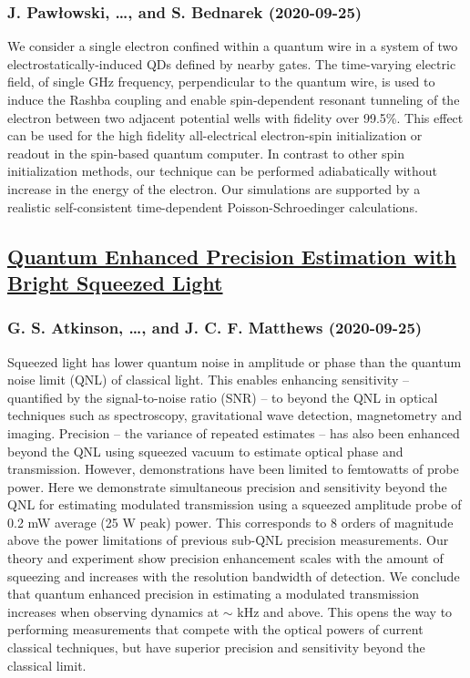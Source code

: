 \subsubsection*{J. Pawłowski, \dots, and S. Bednarek (2020-09-25)}
We consider a single electron confined within a quantum wire in a system of
two electrostatically-induced QDs defined by nearby gates. The time-varying
electric field, of single GHz frequency, perpendicular to the quantum wire, is
used to induce the Rashba coupling and enable spin-dependent resonant tunneling
of the electron between two adjacent potential wells with fidelity over 99.5\%.
This effect can be used for the high fidelity all-electrical electron-spin
initialization or readout in the spin-based quantum computer. In contrast to
other spin initialization methods, our technique can be performed adiabatically
without increase in the energy of the electron. Our simulations are supported
by a realistic self-consistent time-dependent Poisson-Schroedinger
calculations.

\subsection*{\href{http://arxiv.org/abs/2009.12438v1}{Quantum Enhanced Precision Estimation with Bright Squeezed Light}}
\subsubsection*{G. S. Atkinson, \dots, and J. C. F. Matthews (2020-09-25)}
Squeezed light has lower quantum noise in amplitude or phase than the quantum
noise limit (QNL) of classical light. This enables enhancing sensitivity --
quantified by the signal-to-noise ratio (SNR) -- to beyond the QNL in optical
techniques such as spectroscopy, gravitational wave detection, magnetometry and
imaging. Precision -- the variance of repeated estimates -- has also been
enhanced beyond the QNL using squeezed vacuum to estimate optical phase and
transmission. However, demonstrations have been limited to femtowatts of probe
power. Here we demonstrate simultaneous precision and sensitivity beyond the
QNL for estimating modulated transmission using a squeezed amplitude probe of
0.2 mW average (25 W peak) power. This corresponds to 8 orders of magnitude
above the power limitations of previous sub-QNL precision measurements. Our
theory and experiment show precision enhancement scales with the amount of
squeezing and increases with the resolution bandwidth of detection. We conclude
that quantum enhanced precision in estimating a modulated transmission
increases when observing dynamics at $\sim$ kHz and above. This opens the way
to performing measurements that compete with the optical powers of current
classical techniques, but have superior precision and sensitivity beyond the
classical limit.

